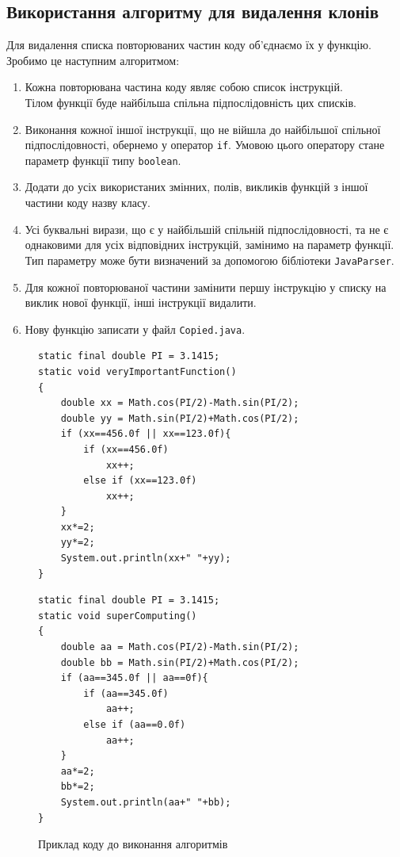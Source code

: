 \documentclass[a4paper, 14pt]{article}
\begin{document}
\subsection{Використання алгоритму для видалення клонів}
Для видалення списка повторюваних частин коду об'єднаємо їх у функцію. \\
Зробимо це наступним алгоритмом: 
\begin{enumerate}
\item Кожна повторювана частина коду являє собою список інструкцій. \\
Тілом функції буде найбільша спільна підпослідовність цих списків.
\item Виконання кожної іншої інструкції, що не війшла до найбільшої спільної підпослідовності, обернемо у оператор \verb|if|.
Умовою цього оператору стане параметр функції типу \verb|boolean|.
\item Додати до усіх використаних змінних, полів, викликів функцій з іншої частини коду назву класу.
\item Усі буквальні вирази, що є у найбільшій спільній підпослідовності, та не є однаковими для усіх відповідних інструкцій, замінимо на параметр функції. Тип параметру може бути визначений за допомогою бібліотеки \verb|JavaParser|.
\item Для кожної повторюваної частини замінити першу інструкцію у списку на виклик нової функції, інші інструкції видалити.
\item Нову функцію записати у файл \verb|Copied.java|.
\end{enumerate}
\newpage
\begin{figure}[h!]
\centering
\begin{minipage}{.45\textwidth}
\begin{lstlisting}[frame=none]
static final double PI = 3.1415;
static void veryImportantFunction()
{
	double xx = Math.cos(PI/2)-Math.sin(PI/2);
	double yy = Math.sin(PI/2)+Math.cos(PI/2);
	if (xx==456.0f || xx==123.0f){
		if (xx==456.0f)
			xx++;
		else if (xx==123.0f)
			xx++;
	}
	xx*=2;
	yy*=2;
	System.out.println(xx+" "+yy);
}
\end{lstlisting}
\end{minipage}
\begin{minipage}{.45\textwidth}
\begin{lstlisting}[frame=none]
static final double PI = 3.1415;
static void superComputing()
{
	double aa = Math.cos(PI/2)-Math.sin(PI/2);
	double bb = Math.sin(PI/2)+Math.cos(PI/2);
	if (aa==345.0f || aa==0f){
		if (aa==345.0f)
			aa++;
		else if (aa==0.0f)
			aa++;
	}
	aa*=2;
	bb*=2;
	System.out.println(aa+" "+bb);
}
\end{lstlisting}
\end{minipage}
\caption{Приклад коду до виконання алгоритмів}
\end{figure}
\end{document}
